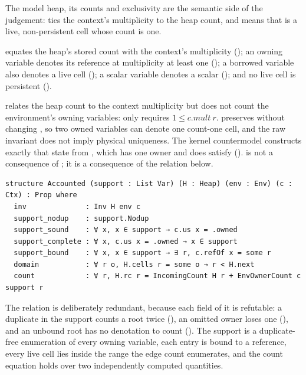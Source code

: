 \documentclass[a4paper,UKenglish,cleveref]{lipics-v2021}
\begin{document}
The model heap, its counts and exclusivity are the semantic side of the
judgement:  ties the context's multiplicity to the heap count, and
 means that  is a live, non-persistent cell whose
count is one.

\begin{definition}\label{def:inv}
 equates the heap's stored count with the context's multiplicity
(); an owning variable denotes its reference at multiplicity at least
one (); a borrowed variable also denotes a live cell ();
a scalar variable denotes a scalar (); and no live cell is persistent
().
\end{definition}

 relates the heap count to the context multiplicity but does not count
the environment's owning variables:  only requires
$1 \le c.\mathit{mult}\ r$.  preserves  without changing
, so two owned variables can denote one count-one cell, and the raw
invariant does not imply physical uniqueness. The kernel countermodel
 constructs exactly that state from
, which has one owner and does satisfy 
().  is not a consequence of
; it is a consequence of the relation below.

\begin{definition}\label{def:accounted}
\begin{lstlisting}
structure Accounted (support : List Var) (H : Heap) (env : Env) (c : Ctx) : Prop where
  inv              : Inv H env c
  support_nodup    : support.Nodup
  support_sound    : ∀ x, x ∈ support → c.us x = .owned
  support_complete : ∀ x, c.us x = .owned → x ∈ support
  support_bound    : ∀ x, x ∈ support → ∃ r, c.refOf x = some r
  domain           : ∀ r o, H.cells r = some o → r < H.next
  count            : ∀ r, H.rc r = IncomingCount H r + EnvOwnerCount c support r
\end{lstlisting}
\end{definition}

The relation is deliberately redundant, because each field of it is refutable:
a duplicate in the support counts a root twice (), an
omitted owner loses one (), and an unbound root has no
denotation to count (). The support is a duplicate-free
enumeration of every owning variable, each entry is bound to a reference, every
live cell lies inside the range the edge count enumerates, and the count equation
holds over two independently computed quantities.
\end{document}

